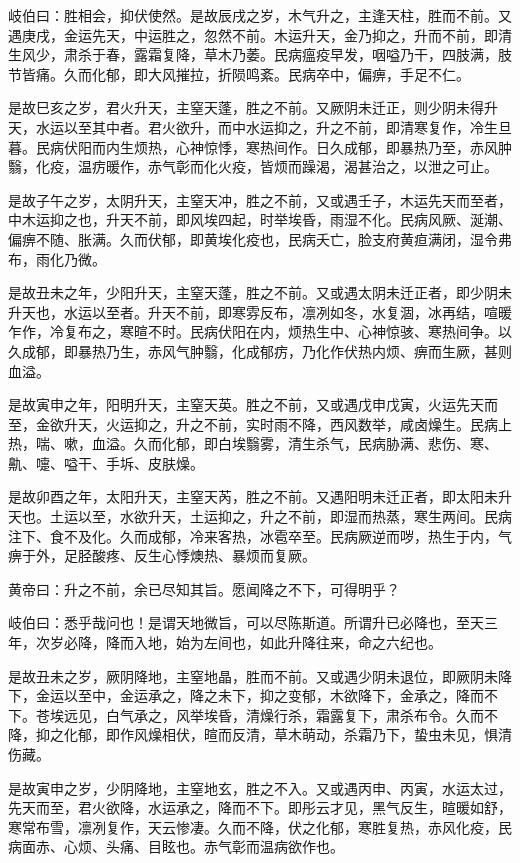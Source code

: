 \documentclass{article}%
\begin{document}
岐伯曰：胜相会，抑伏使然。是故辰戌之岁，木气升之，主逢天柱，胜而不前。又遇庚戌，金运先天，中运胜之，忽然不前。木运升天，金乃抑之，升而不前，即清生风少，肃杀于春，露霜复降，草木乃萎。民病瘟疫早发，咽嗌乃干，四肢满，肢节皆痛。久而化郁，即大风摧拉，折陨鸣紊。民病卒中，偏痹，手足不仁。

是故巳亥之岁，君火升天，主窒天蓬，胜之不前。又厥阴未迁正，则少阴未得升天，水运以至其中者。君火欲升，而中水运抑之，升之不前，即清寒复作，冷生旦暮。民病伏阳而内生烦热，心神惊悸，寒热间作。日久成郁，即暴热乃至，赤风肿翳，化疫，温疠暖作，赤气彰而化火疫，皆烦而躁渴，渴甚治之，以泄之可止。

是故子午之岁，太阴升天，主窒天冲，胜之不前，又或遇壬子，木运先天而至者，中木运抑之也，升天不前，即风埃四起，时举埃昏，雨湿不化。民病风厥、涎潮、偏痹不随、胀满。久而伏郁，即黄埃化疫也，民病夭亡，脸支府黄疸满闭，湿令弗布，雨化乃微。

是故丑未之年，少阳升天，主窒天蓬，胜之不前。又或遇太阴未迁正者，即少阴未升天也，水运以至者。升天不前，即寒雰反布，凛冽如冬，水复涸，冰再结，喧暖乍作，冷复布之，寒暄不时。民病伏阳在内，烦热生中、心神惊骇、寒热间争。以久成郁，即暴热乃生，赤风气肿翳，化成郁疠，乃化作伏热内烦、痹而生厥，甚则血溢。

是故寅申之年，阳明升天，主窒天英。胜之不前，又或遇戊申戊寅，火运先天而至，金欲升天，火运抑之，升之不前，实时雨不降，西风数举，咸卤燥生。民病上热，喘、嗽，血溢。久而化郁，即白埃翳雾，清生杀气，民病胁满、悲伤、寒、鼽、嚏、嗌干、手坼、皮肤燥。

是故卯酉之年，太阳升天，主窒天芮，胜之不前。又遇阳明未迁正者，即太阳未升天也。土运以至，水欲升天，土运抑之，升之不前，即湿而热蒸，寒生两间。民病注下、食不及化。久而成郁，冷来客热，冰雹卒至。民病厥逆而哕，热生于内，气痹于外，足胫酸疼、反生心悸燠热、暴烦而复厥。

黄帝曰：升之不前，余已尽知其旨。愿闻降之不下，可得明乎？

岐伯曰：悉乎哉问也！是谓天地微旨，可以尽陈斯道。所谓升已必降也，至天三年，次岁必降，降而入地，始为左间也，如此升降往来，命之六纪也。

是故丑未之岁，厥阴降地，主窒地晶，胜而不前。又或遇少阴未退位，即厥阴未降下，金运以至中，金运承之，降之未下，抑之变郁，木欲降下，金承之，降而不下。苍埃远见，白气承之，风举埃昏，清燥行杀，霜露复下，肃杀布令。久而不降，抑之化郁，即作风燥相伏，暄而反清，草木萌动，杀霜乃下，蛰虫未见，惧清伤藏。

是故寅申之岁，少阴降地，主窒地玄，胜之不入。又或遇丙申、丙寅，水运太过，先天而至，君火欲降，水运承之，降而不下。即彤云才见，黑气反生，暄暖如舒，寒常布雪，凛冽复作，天云惨凄。久而不降，伏之化郁，寒胜复热，赤风化疫，民病面赤、心烦、头痛、目眩也。赤气彰而温病欲作也。
\end{document}
